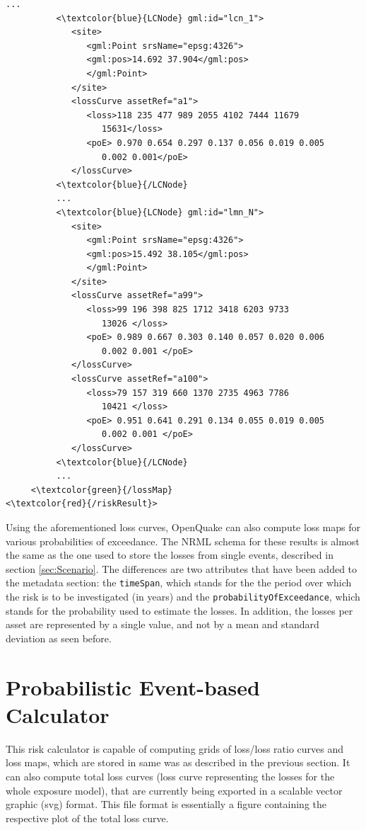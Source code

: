 \begin{Verbatim}[frame=single, commandchars=\\\{\}, samepage=false]
          ...
          <\textcolor{blue}{LCNode} gml:id="lcn_1">
             <site>
                <gml:Point srsName="epsg:4326">
                <gml:pos>14.692 37.904</gml:pos>
                </gml:Point>
             </site>
             <lossCurve assetRef="a1">
                <loss>118 235 477 989 2055 4102 7444 11679 
                   15631</loss>
                <poE> 0.970 0.654 0.297 0.137 0.056 0.019 0.005 
                   0.002 0.001</poE>
             </lossCurve>
          <\textcolor{blue}{/LCNode} 
          ...
          <\textcolor{blue}{LCNode} gml:id="lmn_N">
             <site>
                <gml:Point srsName="epsg:4326">
                <gml:pos>15.492 38.105</gml:pos>
                </gml:Point>
             </site>
             <lossCurve assetRef="a99">
                <loss>99 196 398 825 1712 3418 6203 9733 
                   13026 </loss>
                <poE> 0.989 0.667 0.303 0.140 0.057 0.020 0.006 
                   0.002 0.001 </poE>
             </lossCurve>
             <lossCurve assetRef="a100">
                <loss>79 157 319 660 1370 2735 4963 7786 
                   10421 </loss>
                <poE> 0.951 0.641 0.291 0.134 0.055 0.019 0.005 
                   0.002 0.001 </poE>
             </lossCurve>
          <\textcolor{blue}{/LCNode} 
          ...
     <\textcolor{green}{/lossMap}
<\textcolor{red}{/riskResult}>      
\end{Verbatim}

Using the aforementioned loss curves, OpenQuake can also compute loss maps for various probabilities of exceedance. The NRML schema for these results is almost the same as the one used to store the losses from single events, described in section \ref{sec:Scenario}. The differences are two attributes that have been added to the metadata section: the  \Verb+timeSpan+, which stands for the the period over which the risk is to be investigated (in years) and the \Verb+probabilityOfExceedance+, which stands for the probability used to estimate the losses. In addition, the losses per asset are represented by a single value, and not by a mean and standard deviation as seen before.

\section{Probabilistic Event-based Calculator}
This risk calculator is capable of computing grids of loss/loss ratio curves and loss maps, which are stored in same was as described in the previous section. It can also compute total loss curves (loss curve representing the losses for the whole exposure model), that are currently being exported in a scalable vector graphic (svg) format. This file format is essentially a figure containing the respective plot of the total loss curve.